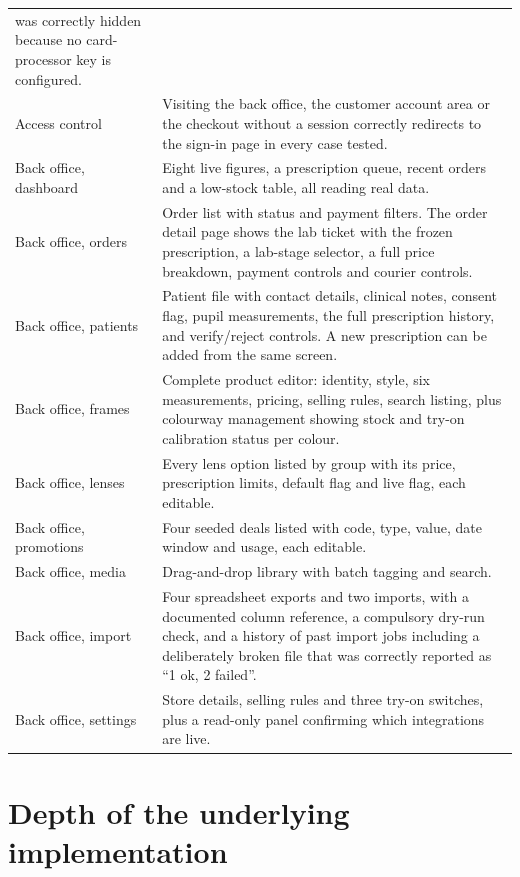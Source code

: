 \documentclass[11pt,a4paper]{report}
\begin{document}
\begin{longtable}{@{}p{}p{}@{}}
was correctly hidden because no card-processor key is configured.\\
\addlinespace
Access control & Visiting the back office, the customer account area or the
checkout without a session correctly redirects to the sign-in page in every
case tested.\\
\addlinespace
Back office, dashboard & Eight live figures, a prescription queue, recent
orders and a low-stock table, all reading real data.\\
\addlinespace
Back office, orders & Order list with status and payment filters. The order
detail page shows the lab ticket with the frozen prescription, a lab-stage
selector, a full price breakdown, payment controls and courier controls.\\
\addlinespace
Back office, patients & Patient file with contact details, clinical notes,
consent flag, pupil measurements, the full prescription history, and
verify/reject controls. A new prescription can be added from the same screen.\\
\addlinespace
Back office, frames & Complete product editor: identity, style, six
measurements, pricing, selling rules, search listing, plus colourway
management showing stock and try-on calibration status per colour.\\
\addlinespace
Back office, lenses & Every lens option listed by group with its price,
prescription limits, default flag and live flag, each editable.\\
\addlinespace
Back office, promotions & Four seeded deals listed with code, type, value,
date window and usage, each editable.\\
\addlinespace
Back office, media & Drag-and-drop library with batch tagging and search.\\
\addlinespace
Back office, import & Four spreadsheet exports and two imports, with a
documented column reference, a compulsory dry-run check, and a history of past
import jobs including a deliberately broken file that was correctly reported
as ``1 ok, 2 failed''.\\
\addlinespace
Back office, settings & Store details, selling rules and three try-on
switches, plus a read-only panel confirming which integrations are live.\\
\bottomrule
\end{longtable}

\section{Depth of the underlying implementation}
\end{document}
